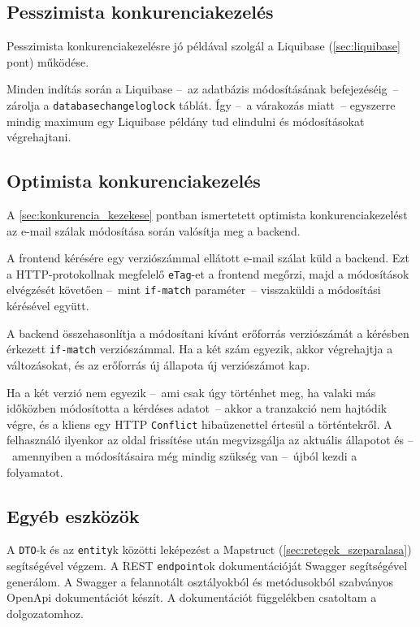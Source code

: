 \subsection{Pesszimista konkurenciakezelés}
Pesszimista konkurenciakezelésre jó példával szolgál a Liquibase (\ref{sec:liquibase} pont) működése. 

Minden indítás során a Liquibase --~az adatbázis módosításának befejezéséig~--   zárolja a \texttt{databasechangeloglock} táblát. Így --~a várakozás miatt~-- egyszerre mindig maximum egy Liquibase példány tud elindulni és módosításokat végrehajtani.


\subsection{Optimista konkurenciakezelés}
A \ref{sec:konkurencia_kezekese} pontban ismertetett optimista konkurenciakezelést az e-mail szálak módosítása során valósítja meg a backend.

A frontend kérésére egy verziószámmal ellátott e-mail szálat küld a backend. Ezt a HTTP-protokollnak megfelelő \texttt{eTag}-et a frontend megőrzi, majd a módosítások elvégzését követően --~mint \texttt{if-match} paraméter~-- visszaküldi a módosítási kérésével együtt.

A backend összehasonlítja a módosítani kívánt erőforrás verziószámát a kérésben érkezett \texttt{if-match} verziószámmal. Ha a két szám egyezik, akkor végrehajtja a változásokat, és az erőforrás új állapota új verziószámot kap.

Ha a két verzió nem egyezik --~ami csak úgy történhet meg, ha valaki más időközben módosította a kérdéses adatot~-- akkor a tranzakció nem hajtódik végre, és a kliens egy HTTP \texttt{Conflict} hibaüzenettel értesül a történtekről. A felhasználó ilyenkor az oldal frissítése után megvizsgálja az aktuális állapotot és --~amennyiben a módosításaira még mindig szükség van --~újból kezdi a folyamatot.

\subsection{Egyéb eszközök}\label{sec:backend_egyeb_eszkozok}
A \texttt{DTO}-k és az \texttt{entity}k közötti leképezést a Mapstruct (\ref{sec:retegek_szeparalasa}) segítségével végzem. A REST \texttt{endpoint}ok dokumentációját Swagger segítségével generálom. A Swagger a felannotált osztályokból és metódusokból szabványos OpenApi dokumentációt készít. A dokumentációt  függelékben csatoltam a dolgozatomhoz.



